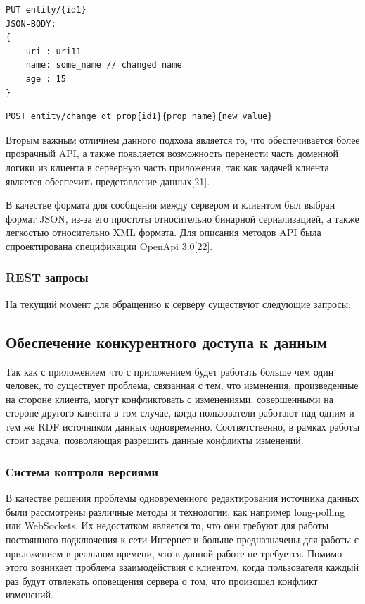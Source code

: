 \documentclass[12pt]{article}
\begin{document}
\begin{lstlisting}[language=XML, caption={Классический CRUD подход}, captionpos=b]
PUT entity/{id1}
JSON-BODY:
{
    uri : uri11
    name: some_name // changed name
    age : 15
}
\end{lstlisting}

\begin{lstlisting}[language=XML, caption={Продвинутый подход}, captionpos=b]
POST entity/change_dt_prop{id1}{prop_name}{new_value}
\end{lstlisting}

Вторым важным отличием данного подхода является то, что обеспечивается более прозрачный API, а также появляется возможность перенести часть доменной логики из клиента в серверную часть приложения, так как задачей клиента является обеспечить представление данных[21].

В качестве формата для сообщения между сервером и клиентом был выбран формат JSON, из-за его простоты относительно бинарной сериализацией, а также легкостью относительно XML формата. Для описания методов API была спроектирована спецификации OpenApi 3.0[22].

\subsubsection{REST запросы}
На текущий момент для обращению к серверу существуют следующие запросы:

\subsection{Обеспечение конкурентного доступа к данным}
Так как с приложением что с приложением будет работать больше чем один человек, то существует проблема, связанная с тем, что изменения, произведенные на стороне клиента, могут конфликтовать с изменениями, совершенными на стороне другого клиента в том случае, когда пользователи работают над одним и тем же RDF источником данных одновременно. Соответственно, в рамках работы стоит задача, позволяющая разрешить данные конфликты изменений.

\subsubsection{Система контроля версиями}
\qquad В качестве решения проблемы одновременного редактирования источника данных были рассмотрены различные методы и технологии, как например long-polling или WebSockets. Их недостатком является то, что они требуют для работы постоянного подключения к сети Интернет и больше предназначены для работы с приложением в реальном времени, что в данной работе не требуется. Помимо этого возникает проблема взаимодействия с клиентом, когда пользователя каждый раз будут отвлекать оповещения сервера о том, что произошел конфликт изменений.
\end{document}
